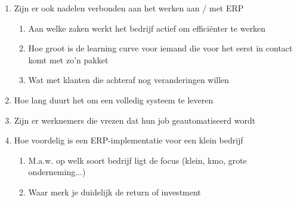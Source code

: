 \begin{enumerate}
    \item Zijn er ook nadelen verbonden aan het werken aan / met ERP
    
    \begin{enumerate}
        \item Aan welke zaken werkt het bedrijf actief om efficiënter te werken
        
        \item Hoe groot is de learning curve voor iemand die voor het eerst in contact komt met zo'n pakket
        
        \item Wat met klanten die achteraf nog veranderingen willen
    \end{enumerate}

    \item Hoe lang duurt het om een volledig systeem te leveren
    
    \item Zijn er werknemers die vrezen dat hun job geautomatiseerd wordt
    
    \item Hoe voordelig is een ERP-implementatie voor een klein bedrijf
    
    \begin{enumerate}
        \item M.a.w. op welk soort bedrijf ligt de focus (klein, kmo, grote onderneming...)
        
        \item Waar merk je duidelijk de return of investment
    \end{enumerate}
\end{enumerate}